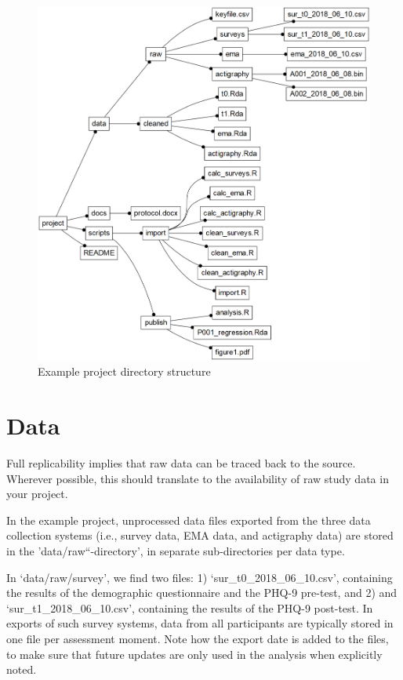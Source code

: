 \documentclass[]{book}
\begin{document}
\begin{figure}

{\centering \includegraphics[width=0.65\linewidth]{images/datamanagement/project_tree} 

}

\caption{Example project directory structure}\label{fig:dm-project-tree}
\end{figure}

\section{Data}\label{data}


Full replicability implies that raw data can be traced back to the
source. Wherever possible, this should translate to the availability of
raw study data in your project.

In the example project, unprocessed data files exported from the three
data collection systems (i.e., survey data, EMA data, and actigraphy
data) are stored in the 'data/raw``-directory', in separate
sub-directories per data type.

In `data/raw/survey', we find two files: 1) `sur\_t0\_2018\_06\_10.csv',
containing the results of the demographic questionnaire and the PHQ-9
pre-test, and 2) and `sur\_t1\_2018\_06\_10.csv', containing the results
of the PHQ-9 post-test. In exports of such survey systems, data from all
participants are typically stored in one file per assessment moment.
Note how the export date is added to the files, to make sure that future
updates are only used in the analysis when explicitly noted.
\end{document}
